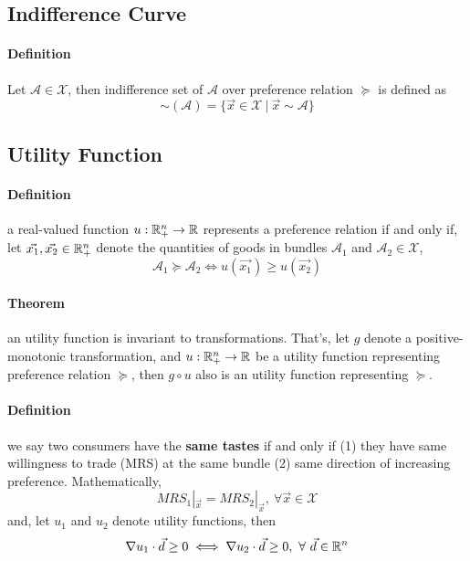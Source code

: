 \documentclass{article}
\newcommand{\mc}[1]{\mathcal{#1}}
\begin{document}
		\subsection{Indifference Curve}
			\paragraph{Definition} Let $\mc{A} \in \mc{X}$, then indifference set of $\mc{A}$ over preference relation $\succcurlyeq$ is defined as
			\[
				\sim(\mc{A}) = \{\vec{x} \in \mc{X}\ | \ \vec{x} \sim \mc{A}\}
			\]
			
		\subsection{Utility Function}
			\paragraph{Definition} a real-valued function ${u}: {\mathbb{R}^n_+} \to {\mathbb{R}}$ represents a preference relation if and only if, let $\vec{x_1}, \vec{x_2} \in \mathbb{R}^n_+$ denote the quantities of goods in bundles $\mc{A}_1$ and $\mc{A}_2 \in \mc{X}$,
			\[
				\mc{A}_1 \succcurlyeq \mc{A}_2 \iff u(\vec{x_1}) \geq u(\vec{x_2})
			\]
			
			\paragraph{Theorem} an utility function is invariant to  transformations. That's, let $g$ denote a positive-monotonic transformation, and ${u}: {\mathbb{R}^n_+} \to {\mathbb{R}}$ be a utility function representing preference relation $\succcurlyeq$, then $g\circ u$ also is an utility function representing $\succcurlyeq$.
			
			\paragraph{Definition} we say two consumers have the \textbf{same tastes} if and only if (1) they have same willingness to trade (MRS) at the same bundle  (2) same direction of increasing preference. 
			\newline Mathematically,
			\[
				MRS_1|_{\vec{x}} = MRS_2 | _{\vec{x}},\ \forall \vec{x} \in \mc{X}
			\] and, let $u_1$ and $u_2$ denote utility functions, then 
			\[
				\nabla u_1 \cdot \vec{d} \geq 0 \iff \nabla u_2 \cdot \vec{d} \geq 0,\ \forall \ \vec{d} \in \R^n
			\]
		
\end{document}
